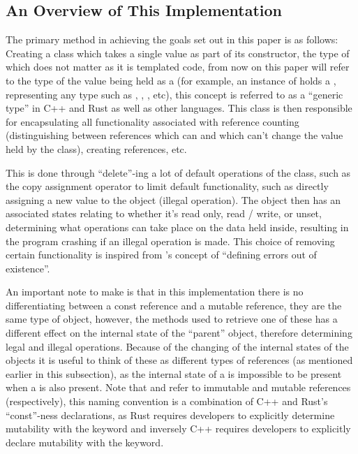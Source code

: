 \documentclass[a4paper]{article}
\begin{document}
\subsection{An Overview of This Implementation}\label{subsection:overview}
The primary method in achieving the goals set out in this paper is as follows: Creating a class which takes a single value as part of its constructor, the type of which does not matter as it is templated code, from now on this paper will refer to the type of the value being held as a  (for example, an instance of  holds a ,  representing any type such as , , , etc), this concept is referred to as a ``generic type'' in C++ and Rust as well as other languages. This class is then responsible for encapsulating all functionality associated with reference counting (distinguishing between references which can and which can't change the value held by the class), creating references, etc.

This is done through ``delete''-ing a lot of default operations of the class, such as the copy assignment operator to limit default functionality, such as directly assigning a new value to the object (illegal operation). The object then has an associated states relating to whether it's read only, read / write, or unset, determining what operations can take place on the data held inside, resulting in the program crashing if an illegal operation is made. This choice of removing certain functionality is inspired from \cite{design-philosophy}'s concept of ``defining errors out of existence''.

An important note to make is that in this implementation there is no differentiating between a const reference and a mutable reference, they are the same type of object, however, the methods used to retrieve one of these has a different effect on the internal state of the ``parent'' object, therefore determining legal and illegal operations. Because of the changing of the internal states of the objects it is useful to think of these as different types of references (as mentioned earlier in this subsection), as the internal state of a  is impossible to be present when a  is also present. Note that  and  refer to immutable and mutable references (respectively), this naming convention is a combination of C++ and Rust's ``const''-ness declarations, as Rust requires developers to explicitly determine mutability with the  keyword and inversely C++ requires developers to explicitly declare mutability with the  keyword.
\end{document}
